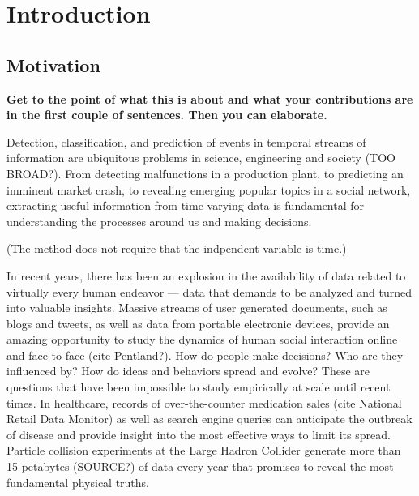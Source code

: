 \chapter{Introduction}
\label{ch:intro}
\section{Motivation}

{\bf Get to the point of what this is about and what your contributions are in
  the first couple of sentences. Then you can elaborate.}

Detection, classification, and prediction of events in temporal streams of information are ubiquitous problems in science, engineering and society (TOO BROAD?). From detecting malfunctions in a production plant, to predicting an imminent market crash, to revealing emerging popular topics in a social network, extracting useful information from time-varying data is fundamental for understanding the processes around us and making decisions.

(The method does not require that the indpendent variable is time.)

In recent years, there has been an explosion in the availability of data related to virtually every human endeavor --- data that demands to be analyzed and turned into valuable insights. Massive streams of user generated documents, such as blogs and tweets, as well as data from portable electronic devices, provide an amazing opportunity to study the dynamics of human social interaction online and face to face (cite Pentland?). How do people make decisions? Who are they influenced by? How do ideas and behaviors spread and evolve? These are questions that have been impossible to study empirically at scale until recent times. In healthcare, records of over-the-counter medication sales (cite National Retail Data Monitor) as well as search engine queries can anticipate the outbreak of disease and provide insight into the most effective ways to limit its spread. Particle collision experiments at the Large Hadron Collider generate more than 15 petabytes (SOURCE?) of data every year that promises to reveal the most fundamental physical truths.

